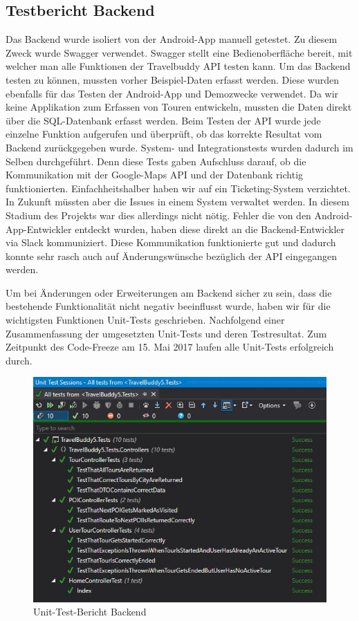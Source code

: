 \subsection{Testbericht Backend}\label{backendTestbericht}
Das Backend wurde isoliert von der Android-App manuell getestet. Zu diesem Zweck wurde Swagger verwendet. Swagger stellt eine Bedienoberfläche bereit, mit welcher man alle Funktionen der Travelbuddy API testen kann. Um das Backend testen zu können, mussten vorher Beispiel-Daten erfasst werden. Diese wurden ebenfalls für das Testen der Android-App und Demozwecke verwendet. Da wir keine Applikation zum Erfassen von Touren entwickeln, mussten die Daten direkt über die SQL-Datenbank erfasst werden. Beim Testen der API wurde jede einzelne Funktion aufgerufen und überprüft, ob das korrekte Resultat vom Backend zurückgegeben wurde. System- und Integrationstests wurden dadurch im Selben durchgeführt. Denn diese Tests gaben Aufschluss darauf, ob die Kommunikation mit der Google-Maps API und der Datenbank richtig funktionierten. Einfachheitshalber haben wir auf ein Ticketing-System verzichtet. In Zukunft müssten aber die Issues in einem System verwaltet werden. In diesem Stadium des Projekts war dies allerdings nicht nötig. Fehler die von den Android-App-Entwickler entdeckt wurden, haben diese direkt an die Backend-Entwickler via Slack kommuniziert. Diese Kommunikation funktionierte gut und dadurch konnte sehr rasch auch auf Änderungswünsche bezüglich der API eingegangen werden.

Um bei Änderungen oder Erweiterungen am Backend sicher zu sein, dass die bestehende Funktionalität nicht negativ beeinflusst wurde, haben wir für die wichtigsten Funktionen Unit-Tests geschrieben. Nachfolgend einer Zusammenfassung der umgesetzten Unit-Tests und deren Testresultat. Zum Zeitpunkt des Code-Freeze am 15. Mai 2017 laufen alle Unit-Tests erfolgreich durch.

\begin{figure}
  \includegraphics{backend_unit_test_summary}
  \caption{Unit-Test-Bericht Backend }
\end{figure}
